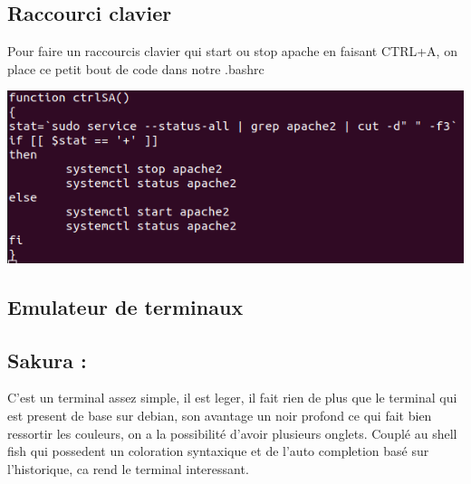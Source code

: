 \documentclass{article}
\begin{document}
 
  \subsection{\large{Raccourci clavier}}
  
  Pour faire un raccourcis clavier qui start ou stop apache en faisant CTRL+A, on place ce petit bout de code dans notre .bashrc
  
  \begin{center}
        \includegraphics[scale=0.6]{Images/CTRLA.png}
  \end{center}
  
 
  \newpage
  
 
 \subsection{\large{Emulateur de terminaux}}
 
 \subsection*{\normalsize{Sakura :} } 
 C'est un terminal assez simple, il est leger, il fait rien de plus que le terminal qui est present de base sur debian, son avantage un noir profond ce qui fait bien ressortir les couleurs, on a la possibilité d'avoir plusieurs onglets. Couplé au shell fish qui possedent un coloration syntaxique et de l'auto completion basé sur l'historique, ca rend le terminal interessant.
 
\end{document}
